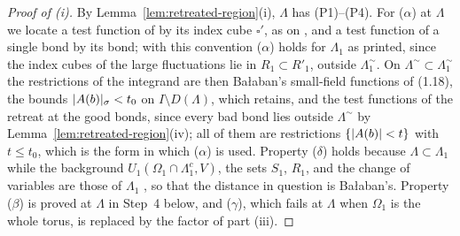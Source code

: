 \documentclass[11pt]{preprint}
\DeclarePairedDelimiter{\abs}{\lvert}{\rvert}
\numberwithin{equation}{section}
\theoremstyle{definition}
\theoremstyle{remark}
\theoremstyle{plain}
\begin{document}
\begin{proof}[Proof of (i)]
By Lemma~\ref{lem:retreated-region}(i), $\Lambda$ has (P1)--(P4). For ($\alpha$) at $\Lambda$ we locate a test function of \cite[(1.18), p.~250]{BalabanCRE} by its index cube $\square'$, as on \cite[p.~251]{BalabanCRE}, and a test function of a single bond by its bond; with this convention ($\alpha$) holds for $\Lambda_1$ as printed, since the index cubes of the large fluctuations lie in $R_1 \subset R'_1$, outside $\Lambda_1^\sim$. On $\Lambda^\sim \subset \Lambda_1^\sim$ the restrictions of the integrand are then Ba{\l}aban's small-field functions of (1.18), the bounds $\abs{A(b)}_\sigma < t_0$ on $I \setminus D(\Lambda)$, which \cite[Lemma~9.7]{WilsonFirstStep} retains, and the test functions of the retreat at the good bonds, since every bad bond lies outside $\Lambda^\sim$ by Lemma~\ref{lem:retreated-region}(iv); all of them are restrictions $\{ \abs{A(b)} < t \}$ with $t \leq t_0$, which is the form in which ($\alpha$) is used. Property ($\delta$) holds because $\Lambda \subset \Lambda_1$ while the background $U_1(\Omega_1 \cap \Lambda_1^c, V)$, the sets $S_1$, $R_1$, and the change of variables \cite[(1.22), p.~251]{BalabanCRE} are those of $\Lambda_1$ \cite[Section~9.4.1]{WilsonFirstStep}, so that the distance in question is Ba{\l}aban's. Property ($\beta$) is proved at $\Lambda$ in Step~4 below, and ($\gamma$), which fails at $\Lambda$ when $\Omega_1$ is the whole torus, is replaced by the factor of part (iii).


\end{proof}
\end{document}
